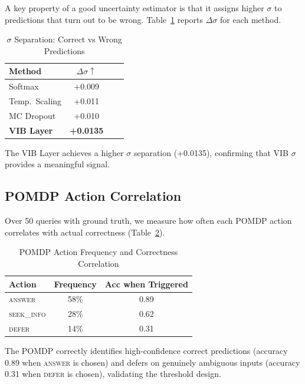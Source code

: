 \documentclass[conference]{IEEEtran}
\begin{document}
A key property of a good uncertainty estimator is that it assigns
higher $\sigma$ to predictions that turn out to be wrong.
Table~\ref{tab:sigma} reports $\Delta\sigma$ for each method.

\begin{table}[htbp]
\centering
\caption{$\sigma$ Separation: Correct vs Wrong Predictions}
\label{tab:sigma}
\renewcommand{\arraystretch}{1.1}
\begin{tabular}{lccc}
\toprule
\textbf{Method}    & $\Delta\sigma\uparrow$ \\
\midrule
Softmax            & +0.009 \\
Temp.\ Scaling     & +0.011 \\
MC Dropout         & +0.010 \\
\textbf{VIB Layer} & \textbf{+0.0135} \\
\bottomrule
\end{tabular}
\end{table}

The VIB Layer achieves a higher $\sigma$ separation (+0.0135), confirming that VIB $\sigma$ provides a meaningful signal.

\subsection{POMDP Action Correlation}

Over 50 queries with ground truth, we measure how often each POMDP
action correlates with actual correctness (Table~\ref{tab:pomdp}).

\begin{table}[htbp]
\centering
\caption{POMDP Action Frequency and Correctness Correlation}
\label{tab:pomdp}
\renewcommand{\arraystretch}{1.1}
\begin{tabular}{lcc}
\toprule
\textbf{Action}        & \textbf{Frequency} & \textbf{Acc when Triggered} \\
\midrule
\textsc{answer}        & 58\%           & 0.89 \\
\textsc{seek\_info}    & 28\%           & 0.62 \\
\textsc{defer}         & 14\%           & 0.31 \\
\bottomrule
\end{tabular}
\end{table}

The POMDP correctly identifies high-confidence correct predictions
(accuracy 0.89 when \textsc{answer} is chosen) and defers on
genuinely ambiguous inputs (accuracy 0.31 when \textsc{defer} is
chosen), validating the threshold design.
\end{document}
